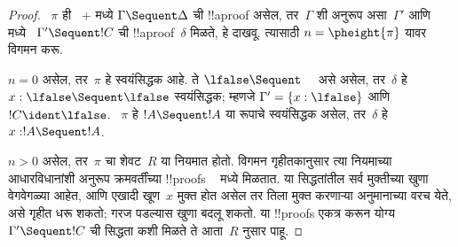 \documentclass[../../../include/open-logic-section]{subfiles}
\begin{document}
\begin{proof}
  ~$\pi$ ही~ + \Cut मध्ये
  $\Gamma \Sequent \Delta$ ची
  !!a{proof} असेल, तर~$\Gamma$
  शी अनुरूप असा~$\Gamma'$ आणि
  ~ मध्ये
  ~$\Gamma' \Sequent !C$ ची
  !!a{proof}~$\delta$ मिळते,
  हे दाखवू. त्यासाठी
  $n = \pheight{\pi}$
  यावर विगमन करू.

  $n = 0$ असेल, तर~$\pi$
  हे स्वयंसिद्धक आहे.
  ते $\lfalse \Sequent \quad$
  असे असेल, तर~$\delta$
  हे $x:\lfalse \Sequent \lfalse$
  स्वयंसिद्धक; म्हणजे
  $\Gamma' = \{x:\lfalse\}$
  आणि $!C \ident \lfalse$.
  ~$\pi$ हे $!A \Sequent !A$
  या रूपाचे स्वयंसिद्धक असेल,
  तर~$\delta$ हे
  $x: !A \Sequent !A$.

  $n>0$ असेल, तर~$\pi$
  चा शेवट~$R$ या नियमात होतो.
  विगमन गृहीतकानुसार त्या नियमाच्या
  आधारविधानांशी अनुरूप क्रमवर्तींच्या
  !!{proof}s ~ मध्ये मिळतात.
  या सिद्धतांतील सर्व मुक्तीच्या खुणा
  वेगवेगळ्या आहेत, आणि एखादी खूण~$x$
  मुक्त होत असेल तर तिला मुक्त करणाऱ्या
  अनुमानाच्या वरच येते, असे गृहीत धरू
  शकतो; गरज पडल्यास खुणा बदलू शकतो.
  या !!{proof}s एकत्र करून योग्य
  $\Gamma' \Sequent !C$ ची सिद्धता
  कशी मिळते ते आता~$R$ नुसार पाहू.


\end{proof}
\end{document}
